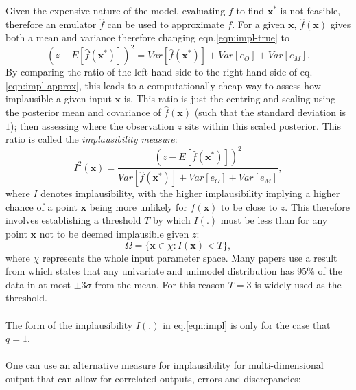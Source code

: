 \documentclass{article}
\newcommand{\numOutputs}{q}
\newcommand{\simulator}{f}
\newcommand{\emulator}{\hat{f}}
\newcommand{\inputVec}{\mathbf{x}}
\newcommand{\obs}{z}
\newcommand{\obsError}{e_O}
\newcommand{\modelDisc}{e_M}
\newcommand{\paramSpace}{\chi}
\newcommand{\impl}{I}
\newcommand{\NROYspace}{\Omega}
\newcommand{\SD}{\sigma}
\newcommand{\thresh}{T}
\begin{document}
Given the expensive nature of the model, evaluating $\simulator$ to find $\inputVec^*$ is not feasible, therefore an emulator $\emulator$ can be used to approximate $\simulator$. For a given $\inputVec$, $\emulator(\inputVec)$ gives both a mean and variance therefore changing eqn.\eqref{eqn:impl-true} to
\begin{equation}
    \label{eqn:impl-approx}
    \left(\obs - E\left[\emulator(\inputVec^*)\right]\right)^2 = Var\left[\emulator(\inputVec^*)\right] + Var[\obsError] + Var[\modelDisc].
\end{equation}
By comparing the ratio of the left-hand side to the right-hand side of eq.\eqref{eqn:impl-approx}, this leads to a computationally cheap way to assess how implausible a given input $\inputVec$ is. This ratio is just the centring and scaling using the posterior mean and covariance of $\emulator(\inputVec)$ (such that the standard deviation is $1$); then assessing where the observation $\obs$ sits within this scaled posterior. This ratio is called the {\it implausibility measure}:
\begin{equation}
    \nonumber
    \impl^2(\inputVec) = \frac{\left(\obs - E\left[\emulator(\inputVec^*)\right]\right)^2}{Var\left[\emulator(\inputVec^*)\right] + Var[\obsError] + Var[\modelDisc]},
\end{equation}
where $\impl$ denotes implausibility, with the higher implausibility implying a higher chance of a point $\inputVec$ being more unlikely for $\simulator(\inputVec)$ to be close to $\obs$. 
This therefore involves establishing a threshold $\thresh$ by which $\impl(.)$ must be less than for any point $\inputVec$ not to be deemed implausible given $\obs$:
\begin{equation}
    \label{eqn:threshold}
    \NROYspace = \{\inputVec \in \paramSpace: \impl(\inputVec)<\thresh\},
\end{equation}
where $\paramSpace$ represents the whole input parameter space.
Many papers \citep{Craig1997,Vernon2010,Iskauskas2022,Williamson2017} use a result from \citet{Pukelsheim1994} which states that any univariate and unimodel distribution has 95\% of the data in at most $\pm 3\SD$ from the mean. For this reason $\thresh=3$ is widely used as the threshold.\\\\
The form of the implausibility $\impl(.)$ in eq.\eqref{eqn:impl} is only for the case that $\numOutputs=1$.\\\\
One can use an alternative measure for implausibility for multi-dimensional output that can allow for correlated outputs, errors and discrepancies:
\end{document}
